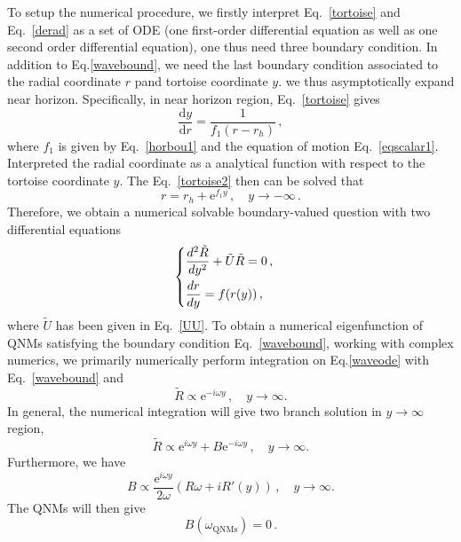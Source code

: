\documentclass[pr, twocolumn, preprintnumbers, showpacs,footnoteadded, superscriptaddress,nofootinbib,longbibliography]{revtex4-1}
\newcommand{\td}{\mathrm{d}}
\newcommand{\te}{\mathrm{e}}
\begin{document}
To setup the numerical procedure, we firstly interpret Eq.~\eqref{tortoise} and Eq.~\eqref{derad} as a set of ODE (one first-order differential equation as well as one second order differential equation), one thus need three boundary condition. In addition to Eq.\eqref{wavebound}, we need the last boundary condition associated to the radial coordinate $r$ pand tortoise coordinate $y$. we thus asymptotically expand near horizon. Specifically, in near horizon region, Eq.~\eqref{tortoise} gives
%
\begin{equation}\label{tortoise2}
\frac{\td y}{\td r}= \frac{1}{f_1 (r-r_h)}\, ,
\end{equation}
%
where $f_1$ is given by Eq.~\eqref{horbou1} and the equation of motion Eq.~\eqref{eqscalar1}. Interpreted the radial coordinate as a analytical function with respect to the tortoise coordinate $y$. The Eq.~\eqref{tortoise2} then can be solved that
%
\begin{equation}\label{wavebound0}
r=r_h+\te^{f_1 y}\, , \quad y \to -\infty \, .
\end{equation}
%
Therefore, we obtain a numerical solvable boundary-valued question with two differential equations
%
\begin{equation}\label{waveode}
\left\{
\begin{aligned}
&\frac{d^2 \tilde{R}}{dy^2}+\tilde{U}\tilde{R}=0 \, , \cr
&\frac{dr}{dy}=f(r(y))\, ,
\end{aligned}
\right.
\end{equation}
%
where $\tilde{U}$ has been given in Eq.~\eqref{UU}. To obtain a numerical eigenfunction of QNMs satisfying the boundary condition Eq.~\eqref{wavebound}, working with complex numerics, we primarily numerically perform integration on Eq.\eqref{waveode} with Eq.~\eqref{wavebound} and
%
\begin{equation}
\tilde{R} \varpropto \te^{- i \omega y} \, ,  \quad y \to \infty.
\end{equation}
%
In general, the numerical integration will give two branch solution in $y \to \infty$ region,
%
\begin{equation}
\tilde{R} \varpropto \te^{i \omega y} + {B} \te^{- i \omega y}\, , \quad y \to \infty.
\end{equation}
%
Furthermore, we have
%
\begin{equation}
{B} \varpropto \frac{\te^{i \omega y}}{2 \omega}\left(R \omega + i R'(y)\right) \, , \quad y \to \infty.
\end{equation}
%
The QNMs will then give
%
\begin{equation}
B \left(\omega_{\text{QNMs}}\right)=0\, .
\end{equation}
\end{document}
